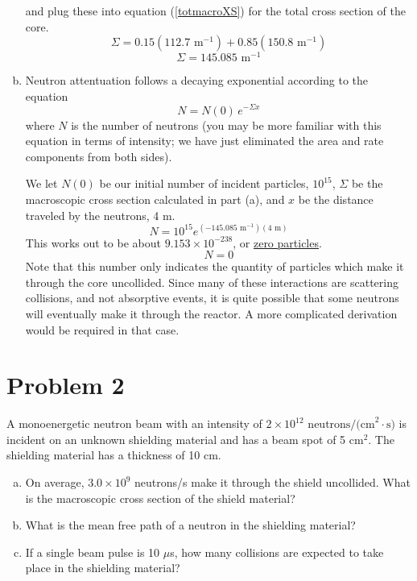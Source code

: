 \documentclass{report}
\begin{document}
\begin{enumerate}[a)]
and plug these into equation (\ref{totmacroXS}) for the total cross section of the core.
$$ \Sigma = 0.15(112.7\text{ m}^{-1}) + 0.85(150.8\text{ m}^{-1})
 $$
$$\boxed{ \Sigma = 145.085\text{ m}^{-1} }$$

\item 

Neutron attentuation follows a decaying exponential according to the equation
$$ N = N(0) \, e^{-\Sigma x} $$
where $N$ is the number of neutrons (you may be more familiar with this equation in terms of intensity; we have just eliminated the area and rate components from both sides).

We let $N(0)$ be our initial number of incident particles, $10^{15}$, $\Sigma$ be the macroscopic cross section calculated in part (a), and $x$ be the distance traveled by the neutrons, 4 m.  
$$ N = 10^{15} e^{(-145.085\text{ m}^{-1})(4\text{ m})} $$
This works out to be about $9.153\times10^{-238}$, or \underline{zero particles}.
$$ N = 0 $$
Note that this number only indicates the quantity of particles which make it through the core uncollided. Since many of these interactions are scattering collisions, and not absorptive events, it is quite possible that some neutrons will eventually make it through the reactor. A more complicated derivation would be required in that case.
\end{enumerate}



\newpage
\section*{Problem 2}

A monoenergetic neutron beam with an intensity of $2 \times 10^{12}\text{ neutrons/(cm}^2{\cdot}\text{s)}$ is incident on an unknown shielding material and has a beam spot of 5 cm$^2$. The shielding material has a thickness of 10 cm.
\begin{enumerate}[a)]
\item On average, $3.0\times10^9$ neutrons/s make it through the shield uncollided. What is the macroscopic cross section of the shield material?
\item What is the mean free path of a neutron in the shielding material?
\item If a single beam pulse is 10 $\mu$s, how many collisions are expected to take place in the shielding material?
\end{enumerate}
\end{document}
